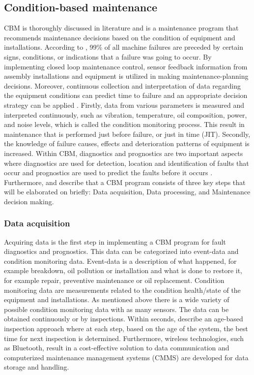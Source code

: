 \subsection{Condition-based maintenance} \label{CBM}
CBM is thoroughly discussed in literature \parencite{Han2003,AHMAD2012} and is a maintenance program that recommends maintenance decisions based on the condition of equipment and installations. According to \citet{Bloch1983}, 99\% of all machine failures are preceded by certain signs, conditions, or indications that a failure was going to occur. By implementing closed loop maintenance control, sensor feedback information from assembly installations and equipment is utilized in making maintenance-planning decisions. Moreover, continuous collection and interpretation of data regarding the equipment conditions can predict time to failure and an appropriate decision strategy can be applied \parencite{Mann1995}. Firstly, data from various parameters is measured and interpreted continuously, such as vibration, temperature, oil composition, power, and noise levels, which is called the condition monitoring process. This result in maintenance that is performed  just before failure, or just in time (JIT). Secondly, the knowledge of failure causes, effects and deterioration patterns of equipment is increased. Within CBM, diagnostics and prognostics are two important aspects where diagnostics are used for detection, location and identification of faults that occur and prognostics are used to predict the faults before it occurs \parencite{JARDINE2006}. Furthermore, \citet{JARDINE2006} and \citet{Goyal2017} describe that a CBM program consists of three key steps that will be elaborated on briefly: Data acquisition, Data processing, and Maintenance decision making.

\subsubsection{Data acquisition}
Acquiring data is the first step in implementing a CBM program for fault diagnostics and prognostics.  This data can be categorized into event-data and condition monitoring data. Event-data is a description of what happened, for example breakdown, oil pollution or installation and what is done to restore it, for example repair, preventive maintenance or oil replacement. Condition monitoring data are measurements related to the condition health/state of the equipment and installations. As mentioned above there is a wide variety of possible condition monitoring data with as many sensors. The data can be obtained continuously or by inspections. Within seconds, \citet{Golmakani2011} describe an age-based inspection approach where at each step, based on the age of the system, the best time for next inspection is determined. Furthermore, wireless technologies, such as Bluetooth, result in a cost-effective solution to data communication and computerized maintenance management systems (CMMS) are developed for data storage and handling. 

